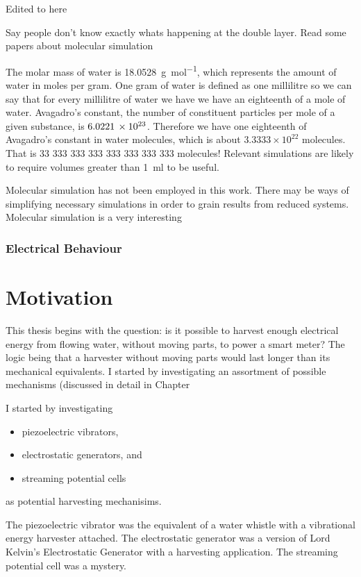     {\color{blue} Edited to here

    Say people don't know exactly whats happening at the double layer.
    Read some papers about molecular simulation
    }

    The molar mass of water is \SI{18.0528}{\gram\per\mole}, which represents the amount of water in moles per gram. 
    One gram of water is defined as one millilitre so we can say that for every millilitre of water we have we have an eighteenth of a mole of water. 
    Avagadro's constant, the number of constituent particles per mole of a given substance, is $6.0221\thinspace \times 10^{23}$.
    Therefore we have one eighteenth of Avagadro's constant in water molecules, which is about $3.3333\times 10^{22}$ molecules.
    That is 33 333 333 333 333 333 333 333 molecules!
    Relevant simulations are likely to require volumes greater than \SI{1}{\milli\litre} to be useful.
    
    Molecular simulation has not been employed in this work.
    There may be ways of simplifying necessary simulations in order to grain results from reduced systems.
    Molecular simulation is a very interesting


  \subsubsection*{Electrical Behaviour}

\section{Motivation}
  This thesis begins with the question: is it possible to harvest enough electrical energy from flowing water, without moving parts, to power a smart meter?
  The logic being that a harvester without moving parts would last longer than its mechanical equivalents.
  I started by investigating an assortment of possible mechanisms (discussed in detail in Chapter

  I started by investigating
  \begin{itemize}
    \item piezoelectric vibrators,
    \item electrostatic generators, and
    \item streaming potential cells
  \end{itemize}
  as potential harvesting mechanisims.

  The piezoelectric vibrator was the equivalent of a water whistle with a vibrational energy harvester attached.
  The electrostatic generator was a version of Lord Kelvin's Electrostatic Generator with a harvesting application.
  The streaming potential cell was a mystery.


